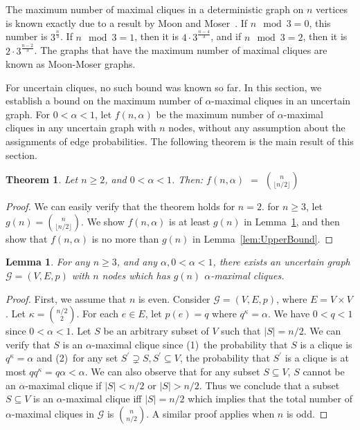 \documentclass[11pt,letterpaper]{article}
\newtheorem{theorem}{Theorem}
\newtheorem{lemma}{Lemma}
\newcommand{\ugraph}{\mathcal{G}}
\begin{document}
The maximum number of maximal cliques in a deterministic graph on $n$
vertices is known exactly due to a result by Moon and Moser~\cite{MM65}. 
If $n \mod 3 = 0$, this number is $3^{\frac{n}{3}}$. If $n \mod 3 = 1$, then it 
is $4 \cdot 3^{\frac{n-4}{3}}$, and if $n \mod 3 = 2$, then it is $2 \cdot
3^{\frac{n-2}{3}}$. The graphs that have the maximum number of maximal
cliques are known as Moon-Moser graphs.

For uncertain cliques, no such bound was known so far. In this
section, we establish a bound on the maximum number of
$\alpha$-maximal cliques in an uncertain graph. 
For $0 < \alpha < 1$,
let $f(n,\alpha)$ be the maximum number of $\alpha$-maximal cliques in
any uncertain graph with $n$ nodes, without any assumption about the 
assignments of edge probabilities. 
The following theorem is the main result of this section.

\begin{theorem}\label{thm:maximum}
Let $n \ge 2$, and $0 < \alpha < 1$. Then: $f(n,\alpha)$ $=$ $n \choose {\lfloor n/2\rfloor}$
\end{theorem}

\begin{proof}
We can easily verify that the theorem holds for $n=2$.
for $n \ge 3$, let $g(n) = {n \choose {\lfloor n/2\rfloor}}$. 
We show $f(n,\alpha)$ is at least $g(n)$ in Lemma~\ref{lem:maxCliq}, and then show that
$f(n,\alpha)$ is no more than $g(n)$ in Lemma~\ref{lem:UpperBound}.
\end{proof}

\begin{lemma}
\label{lem:maxCliq}
For any $n \ge 3$, and any $\alpha, 0 < \alpha < 1$, there exists an
uncertain graph $\ugraph = (V,E,p)$ with $n$ nodes which has $g(n)$
$\alpha$-maximal cliques.
\end{lemma}

\begin{proof}
First, we assume that $n$ is even. 
Consider $\ugraph = (V,E,p)$, where
$E = V \times V$. Let $\mbox{$\kappa = {{n/2} \choose 2}$}$.
For each $e \in E$, let $p(e)=q$ where $q^{\kappa}=\alpha$.
We have $0 <q <1$ since $0< \alpha <1$.
Let $S$ be an arbitrary subset of $V$ such that  $|S|=n/2$.
We can verify that $S$ is an $\alpha$-maximal clique since
(1)~the probability that $S$ is a clique is $q^{\kappa}=\alpha$ and 
(2)~for any set $S^\prime \supsetneq S, S^\prime \subseteq V$,
the probability that $S^\prime$ is a clique is at most $q q^{\kappa}=q\alpha <\alpha$.
We can also observe that for any subset $S \subseteq V$, $S$ cannot be an
$\alpha$-maximal clique if $|S|< n/2$ or $|S|> n/2$. Thus
we conclude that a subset $S\subseteq V$ is an $\alpha$-maximal clique iff
$|S|=n/2$ which implies that the total number of $\alpha$-maximal
cliques in $\ugraph$ is $n \choose {n/2}$.
A similar proof applies when $n$ is odd. 
\end{proof}
\end{document}

